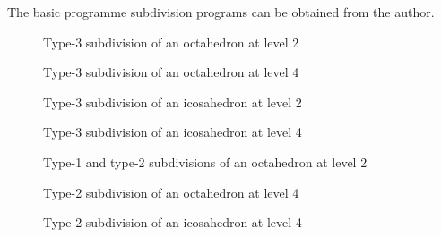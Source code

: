 \documentclass[12pt]{article}
\begin{document}
The basic programme subdivision programs can be obtained from the author.
\newpage
\vspace*{11cm}
\begin{figure}[htb]
\caption{ 
Type-3 subdivision of an octahedron at level 2 
}
\end{figure}
\newpage
\vspace*{11cm}
\begin{figure}[htb]
\caption{ 
Type-3 subdivision of an octahedron at level 4 
}
\end{figure}
\newpage
\vspace*{11cm}
\begin{figure}[htb]
\caption{ 
Type-3 subdivision of an icosahedron at level 2 
}
\end{figure}
\newpage
\vspace*{11cm}
\begin{figure}[htb]
\caption{ 
Type-3 subdivision of an icosahedron at level 4 
}
\end{figure}
\newpage
\vspace*{11cm}
\begin{figure}[htb]
\caption{ 
Type-1 and type-2 subdivisions of an octahedron at level 2 
}
\end{figure}
\newpage
\vspace*{11cm}
\begin{figure}[htb]
\caption{ 
Type-2 subdivision of an octahedron at level 4 
}
\end{figure}
\newpage
\vspace*{11cm}
\begin{figure}[htb]
\caption{ 
Type-2 subdivision of an icosahedron at level 4 
}
\end{figure}



\end{document}
